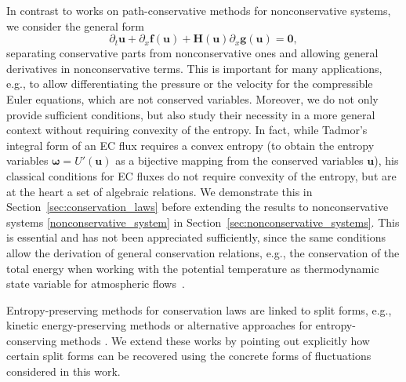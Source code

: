 \documentclass[]{scrartcl}
\renewcommand{\vec}[1]{\boldsymbol{#1}}
\theoremstyle{definition}
\begin{document}
In contrast to works on path-conservative methods for nonconservative systems, we consider the general form
\begin{equation}
    \partial_t \vec{u} + \partial_x \vec{f}(\vec{u}) + \vec{H}(\vec{u}) \partial_x \vec{g}(\vec{u}) = \vec{0},
    \label{nonconservative_system}
\end{equation}
separating conservative parts from nonconservative ones and allowing general derivatives in nonconservative terms.
This is important for many applications, e.g., to allow differentiating the pressure or the velocity for the compressible Euler equations, which are not conserved variables.
Moreover, we do not only provide sufficient conditions, but also study their necessity in a more general context without requiring convexity of the entropy.
In fact, while Tadmor's integral form of an EC flux requires a convex entropy (to obtain the entropy variables $\vec{\omega} = U'(\vec{u})$ as a bijective mapping from the conserved variables $\vec{u}$), his classical conditions for EC fluxes do not require convexity of the entropy, but are at the heart a set of algebraic relations.
We demonstrate this in Section~\ref{sec:conservation_laws} before extending the results to nonconservative systems \eqref{nonconservative_system} in Section~\ref{sec:nonconservative_systems}.
This is essential and has not been appreciated sufficiently, since the same conditions allow the derivation of general conservation relations, e.g., the conservation of the total energy when working with the potential temperature as thermodynamic state variable for atmospheric flows~\cite{artiano2025structurepreservinghighordermethodscompressible}.

Entropy-preserving methods for conservation laws are linked to split forms, e.g., kinetic energy-preserving methods \cite{gassner2016split} or alternative approaches for entropy-conserving methods \cite{DEMICHELE2025114262}.
We extend these works by pointing out explicitly how certain split forms can be recovered using the concrete forms of fluctuations considered in this work.
\end{document}
